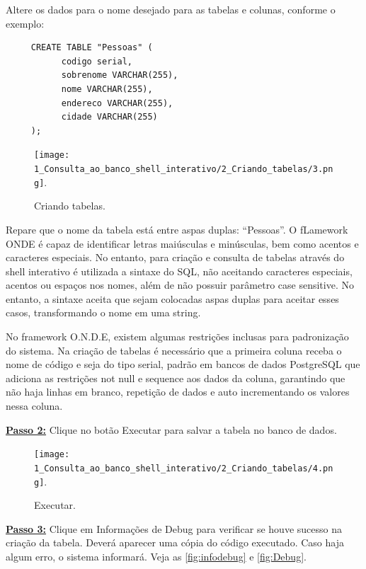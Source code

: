 \documentclass[9pt]{report}
\begin{document}
{   Altere os dados para o nome desejado para as tabelas e colunas,
   conforme o exemplo:
   
   \begin{lstlisting}
     CREATE TABLE "Pessoas" (
           codigo serial,
           sobrenome VARCHAR(255),
           nome VARCHAR(255),
           endereco VARCHAR(255),
           cidade VARCHAR(255) 
     );
   \end{lstlisting}


   \begin{figure}[H]
     \texttt{[image: 1\_Consulta\_ao\_banco\_shell\_interativo/2\_Criando\_tabelas/3.png]}.     
     \caption{Criando tabelas.}
     \label{fig:criandoTabelas}
   \end{figure}

    Repare que o nome da tabela está entre aspas duplas: “Pessoas”.
    O fLamework ONDE é capaz de identificar letras maiúsculas
    e minúsculas, bem como acentos e caracteres especiais. No
    entanto,
    para criação e consulta de tabelas através do shell interativo é
    utilizada a sintaxe do SQL, não aceitando caracteres especiais,
    acentos ou espaços nos nomes, além de não possuir parâmetro case
    sensitive. No entanto, a sintaxe aceita que sejam colocadas aspas
    duplas para aceitar esses casos, transformando o nome em uma
    string.

    No framework O.N.D.E, existem algumas restrições inclusas para
    padronização do sistema. Na criação de tabelas é necessário que
    a primeira coluna receba o nome de código e seja do tipo serial,
    padrão em bancos de dados PostgreSQL que adiciona as restrições
    not null e sequence aos dados da coluna, garantindo que não haja
    linhas em branco, repetição de dados e auto incrementando os
    valores nessa coluna.

    \underline{\textbf{Passo 2:}}  Clique no botão Executar para
    salvar a tabela no banco de dados.
   
   \begin{figure}[H]
     \texttt{[image: 1\_Consulta\_ao\_banco\_shell\_interativo/2\_Criando\_tabelas/4.png]}.     
     \caption{ Executar.}
     \label{fig:executandoConsulta}
   \end{figure}
   
   \underline{\textbf{Passo 3:}}  Clique em Informações de Debug para
   verificar se houve sucesso na criação da tabela. Deverá aparecer
   uma cópia do código executado. Caso haja algum erro, o sistema
   informará.
   Veja as \figurename{ \ref{fig:infodebug}} e \figurename{ \ref{fig:Debug}}.

}
\end{document}
